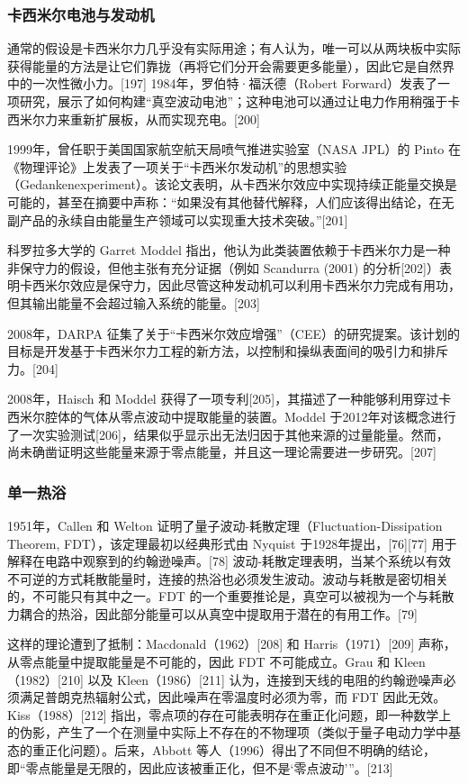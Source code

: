 \subsubsection{卡西米尔电池与发动机}
通常的假设是卡西米尔力几乎没有实际用途；有人认为，唯一可以从两块板中实际获得能量的方法是让它们靠拢（再将它们分开会需要更多能量），因此它是自然界中的一次性微小力。[197] 1984年，罗伯特·福沃德（Robert Forward）发表了一项研究，展示了如何构建“真空波动电池”；这种电池可以通过让电力作用稍强于卡西米尔力来重新扩展板，从而实现充电。[200]  

1999年，曾任职于美国国家航空航天局喷气推进实验室（NASA JPL）的 Pinto 在《物理评论》上发表了一项关于“卡西米尔发动机”的思想实验（Gedankenexperiment）。该论文表明，从卡西米尔效应中实现持续正能量交换是可能的，甚至在摘要中声称：“如果没有其他替代解释，人们应该得出结论，在无副产品的永续自由能量生产领域可以实现重大技术突破。”[201]  

科罗拉多大学的 Garret Moddel 指出，他认为此类装置依赖于卡西米尔力是一种非保守力的假设，但他主张有充分证据（例如 Scandurra (2001) 的分析[202]）表明卡西米尔效应是保守力，因此尽管这种发动机可以利用卡西米尔力完成有用功，但其输出能量不会超过输入系统的能量。[203]  

2008年，DARPA 征集了关于“卡西米尔效应增强”（CEE）的研究提案。该计划的目标是开发基于卡西米尔力工程的新方法，以控制和操纵表面间的吸引力和排斥力。[204]  

2008年，Haisch 和 Moddel 获得了一项专利[205]，其描述了一种能够利用穿过卡西米尔腔体的气体从零点波动中提取能量的装置。Moddel 于2012年对该概念进行了一次实验测试[206]，结果似乎显示出无法归因于其他来源的过量能量。然而，尚未确凿证明这些能量来源于零点能量，并且这一理论需要进一步研究。[207]  
\subsubsection{单一热浴} 
1951年，Callen 和 Welton 证明了量子波动-耗散定理（Fluctuation-Dissipation Theorem, FDT），该定理最初以经典形式由 Nyquist 于1928年提出，[76][77] 用于解释在电路中观察到的约翰逊噪声。[78] 波动-耗散定理表明，当某个系统以有效不可逆的方式耗散能量时，连接的热浴也必须发生波动。波动与耗散是密切相关的，不可能只有其中之一。FDT 的一个重要推论是，真空可以被视为一个与耗散力耦合的热浴，因此部分能量可以从真空中提取用于潜在的有用工作。[79]  

这样的理论遭到了抵制：Macdonald（1962）[208] 和 Harris（1971）[209] 声称，从零点能量中提取能量是不可能的，因此 FDT 不可能成立。Grau 和 Kleen（1982）[210] 以及 Kleen（1986）[211] 认为，连接到天线的电阻的约翰逊噪声必须满足普朗克热辐射公式，因此噪声在零温度时必须为零，而 FDT 因此无效。Kiss（1988）[212] 指出，零点项的存在可能表明存在重正化问题，即一种数学上的伪影，产生了一个在测量中实际上不存在的不物理项（类似于量子电动力学中基态的重正化问题）。后来，Abbott 等人（1996）得出了不同但不明确的结论，即“零点能量是无限的，因此应该被重正化，但不是‘零点波动’”。[213]  


